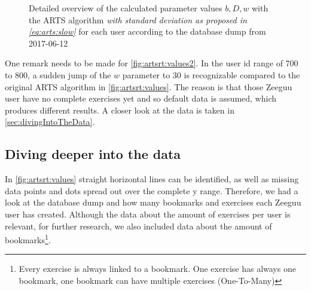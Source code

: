 \documentclass{article}
\begin{document}
\begin{figure}[H]
\caption{Detailed overview of the calculated parameter values $b, D, w$ with the ARTS algorithm \textit{with standard deviation as proposed in \autoref{eq:arts:slow}} for each user according to the database dump from 2017-06-12}
\label{fig:artsrt:values2}
\end{figure}

One remark needs to be made for \autoref{fig:artsrt:values2}. In the user id range of 700 to 800, a sudden jump of the $w$ parameter to 30 is recognizable compared to the original ARTS algorithm in \autoref{fig:artsrt:values}. The reason is that those Zeeguu user have no complete exercises yet and so default data is assumed, which produces different results. A closer look at the data is taken in \autoref{sec:divingIntoTheData}.


\subsection{Diving deeper into the data}\label{sec:divingIntoTheData}
In \autoref{fig:artsrt:values} straight horizontal lines can be identified, as well as missing data points and dots spread out over the complete y range. Therefore, we had a look at the database dump and how many bookmarks and exercises each Zeeguu user has created. Although the data about the amount of exercises per user is relevant, for further research, we also included data about the amount of bookmarks\footnote{Every exercise is always linked to a bookmark. One exercise has always one bookmark, one bookmark can have multiple exercises (One-To-Many)}.
\end{document}
